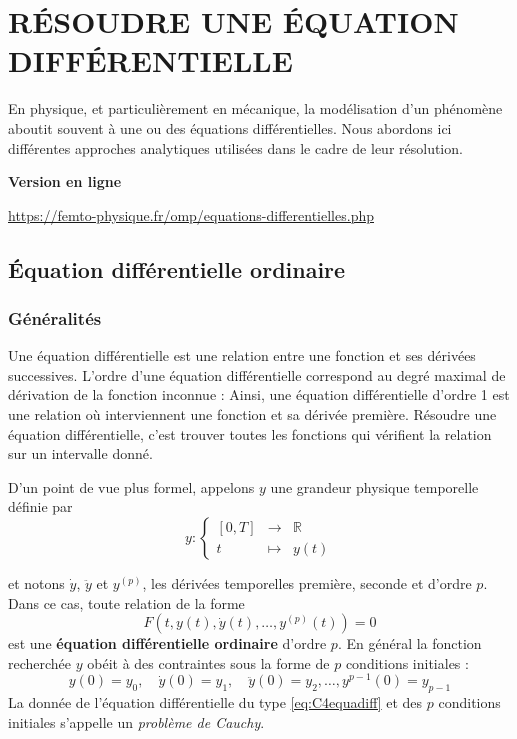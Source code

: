 \setchapterpreamble[u]{\margintoc} 
\chapter{RÉSOUDRE UNE ÉQUATION DIFFÉRENTIELLE}

En physique, et particulièrement en mécanique, la modélisation d'un phénomène aboutit souvent à une ou des équations différentielles.  Nous abordons ici différentes approches analytiques utilisées dans le cadre de leur résolution.

\begin{center}
\textbf{Version en ligne}

	\url{https://femto-physique.fr/omp/equations-differentielles.php}
\end{center}

\section[EDO]{Équation différentielle ordinaire}

\subsection{Généralités}
Une \'equation diff\'erentielle est une relation entre une fonction et ses d\'eriv\'ees successives. L’ordre  d’une \'equation diff\'erentielle correspond au degr\'e maximal de d\'erivation de la fonction inconnue : Ainsi, une \'equation diff\'erentielle d’ordre 1 est une relation où  interviennent une fonction et sa d\'eriv\'ee première. R\'esoudre une \'equation diff\'erentielle, c’est trouver toutes les fonctions qui v\'erifient la relation sur un intervalle donn\'e.

D'un point de vue plus formel, appelons $y$ une grandeur physique temporelle définie par 
\[
y:
\left\{
\begin{array}{ccc}
[0,T]	& \to	&	\mathbb{R} \\
t	& \mapsto & y(t)
\end{array}
\right.
\]

et notons $\dot{y}$, $\ddot{y}$ et $y^{(p)}$, les dérivées temporelles première, seconde et d'ordre $p$. Dans ce cas, toute relation de la forme
\begin{equation}
	F(t,y(t),\dot{y}(t),\dots,y^{(p)}(t))=0\label{eq:C4equadiff}
\end{equation}
est une \textbf{équation différentielle ordinaire} d'ordre $p$. En général la fonction recherchée $y$ obéit à des contraintes sous la forme de $p$ conditions initiales : 
\[
y(0) = y_{0}, \quad \dot{y}(0)  =  y_{1}, \quad \ddot{y}(0)=y_{2},\dots, y^{p-1}(0) = y_{p-1}
\]
La donnée de l'équation différentielle du type \eqref{eq:C4equadiff} et des $p$ conditions initiales s'appelle un \emph{problème de Cauchy}. 

